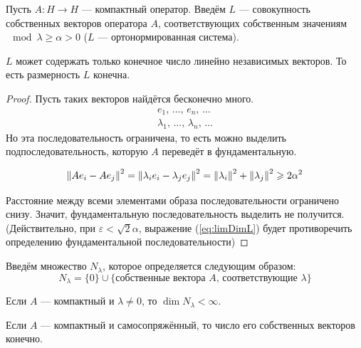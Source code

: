 \documentclass[12pt]{article}
\begin{document}
	Пусть $A: H \rightarrow H$ --- компактный оператор. Введём $L$ --- совокупность собственных векторов 
	оператора $A$, соответствующих собственным значениям $\mod{\lambda} \geq \alpha > 0$ 
	($L$ --- ортонормированная система).
	\begin{state} \label{st:limLambda}	
		$L$ может содержать только конечное число {\color{gray}линейно независимых} векторов.		
		{\color{gray} То есть размерность $L$ конечна.}
	\end{state}
	\begin{proof}
		Пусть таких векторов найдётся бесконечно много.
		\begin{gather*}
		 	e_1      ,\, \dots,\, e_n      ,\, \dots \\
			\lambda_1,\, \dots,\, \lambda_n,\, \dots
		\end{gather*}
		Но эта последовательность ограничена, то есть можно выделить подпоследовательность, которую $A$ переведёт в фундаментальную.
		
		\begin{equation} \label{eq:limDimL}
			\left\| Ae_i - Ae_j \right\|^2 = \left\| \lambda_ie_i - \lambda_je_j \right\|^2 = \left\| \lambda_i \right\|^2 + \left\| \lambda_j \right\|^2 \geqslant 2\alpha^2
		\end{equation}
		
		Расстояние между всеми элементами образа последовательности ограничено снизу. Значит, фундаментальную последовательность
		выделить не получится. \color{gray}(Действительно, при $\varepsilon < \sqrt{2}\alpha$, выражение (\ref{eq:limDimL}) будет 
		противоречить определению фундаментальной последовательности)
	\end{proof}
	
	Введём множество $N_{\lambda}$, которое определяется следующим образом:
	$$N_{\lambda} = \{0\} \cup \{\text{собственные вектора $A$, соответствующие $\lambda$}\}$$
	
	\begin{note}
		Если $A$ --- компактный и $\lambda \neq 0$, то $\dim N_{\lambda} < \infty$.
	\end{note}
	\begin{note}
		Если $A$ --- компактный и самосопряжённый, то число его собственных векторов конечно.
	\end{note}
	
\end{document}
